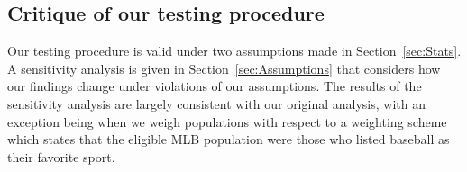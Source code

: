 \documentclass[11pt]{article}\usepackage[]{graphicx}\usepackage[]{color}
\begin{document}

\subsection{Critique of our testing procedure}
\label{ourcritique}
Our testing procedure is valid under two assumptions made in 
Section~\ref{sec:Stats}.  A sensitivity analysis is given in 
Section~\ref{sec:Assumptions} that considers how our findings change under 
violations of our assumptions.  The results of the sensitivity analysis are  
largely consistent with our original analysis, with an exception being when 
we weigh populations with respect to a weighting scheme which states that 
the eligible MLB population were those who listed baseball as their favorite 
sport.  
\end{document}
